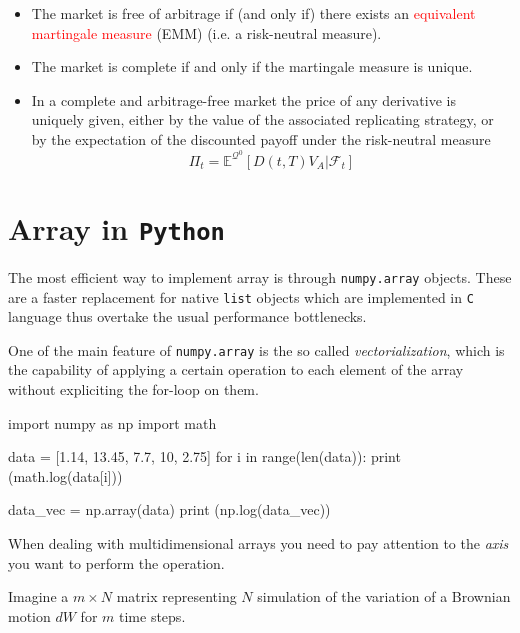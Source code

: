 \documentclass[12pt,a4paper]{article}
\begin{document}
\begin{itemize}
\item The market is free of arbitrage if (and only if) there exists an \textcolor{red}{equivalent martingale measure} (EMM) (i.e. a risk-neutral measure).
\item The market is complete if and only if the martingale measure is unique.
\item In a complete and arbitrage-free market the price of any derivative is uniquely given, either by the value of the associated replicating strategy, or by the expectation of the discounted payoff under the risk-neutral measure
\begin{equation}
\Pi_t = \mathbb{E}^{\mathcal{Q}^0}[D(t,T)V_A|\mathcal{F}_t]
\label{eq:risk_neutral_pricing}
\end{equation}
\end{itemize}

\clearpage
\section{Array in \texttt{Python}}

The most efficient way to implement array is through \texttt{numpy.array} objects. These are a faster replacement for native \texttt{list} objects which are implemented in \texttt{C} language thus overtake the usual performance bottlenecks. 

One of the main feature of \texttt{numpy.array} is the so called \emph{vectorialization}, which is the capability of applying a certain operation to each element of the array without expliciting the for-loop on them.

\begin{ipython}
import numpy as np
import math 

data = [1.14, 13.45, 7.7, 10, 2.75]
for i in range(len(data)):
	print (math.log(data[i]))
	
data_vec = np.array(data)
print (np.log(data_vec))
\end{ipython}

When dealing with multidimensional arrays you need to pay attention to the \emph{axis} you want to perform the operation.

Imagine a $m\times N$ matrix representing $N$ simulation of the variation of a Brownian motion $dW$ for $m$ time steps.
\end{document}
